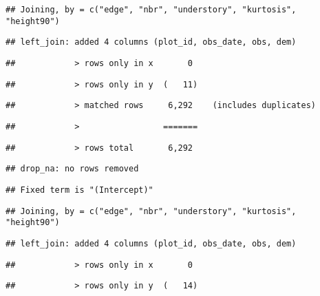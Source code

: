 \documentclass[
]{article}
\begin{document}
\begin{verbatim}
## Joining, by = c("edge", "nbr", "understory", "kurtosis", "height90")
\end{verbatim}

\begin{verbatim}
## left_join: added 4 columns (plot_id, obs_date, obs, dem)
\end{verbatim}

\begin{verbatim}
##            > rows only in x       0
\end{verbatim}

\begin{verbatim}
##            > rows only in y  (   11)
\end{verbatim}

\begin{verbatim}
##            > matched rows     6,292    (includes duplicates)
\end{verbatim}

\begin{verbatim}
##            >                 =======
\end{verbatim}

\begin{verbatim}
##            > rows total       6,292
\end{verbatim}

\begin{verbatim}
## drop_na: no rows removed
\end{verbatim}

\begin{verbatim}
## Fixed term is "(Intercept)"
\end{verbatim}

\begin{verbatim}
## Joining, by = c("edge", "nbr", "understory", "kurtosis", "height90")
\end{verbatim}

\begin{verbatim}
## left_join: added 4 columns (plot_id, obs_date, obs, dem)
\end{verbatim}

\begin{verbatim}
##            > rows only in x       0
\end{verbatim}

\begin{verbatim}
##            > rows only in y  (   14)
\end{verbatim}
\end{document}

